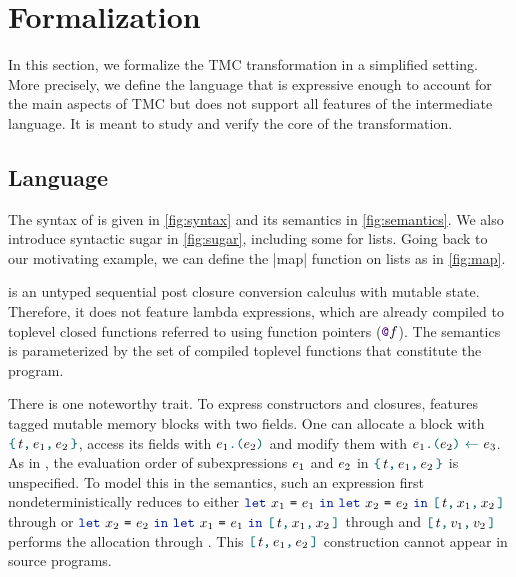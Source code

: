\section{Formalization}

In this section, we formalize the TMC transformation in a simplified setting.
More precisely, we define the \DataLang language that is expressive enough to account for the main aspects of TMC but does not support all features of the \LambdaLang intermediate language.
It is meant to study and verify the core of the transformation.

\subsection{Language}

The syntax of \DataLang is given in \cref{fig:syntax} and its semantics in \cref{fig:semantics}.
We also introduce syntactic sugar in \cref{fig:sugar}, including some for lists.
Going back to our motivating example, we can define the \datalang|map| function on lists as in \cref{fig:map}.

\DataLang is an untyped sequential post closure conversion calculus with mutable state.
Therefore, it does not feature lambda expressions, which are already compiled to toplevel closed functions referred to using function pointers ($\datalangFnptr{\datalangFn}$).
The semantics is parameterized by the set of compiled toplevel functions that constitute the program.

There is one noteworthy trait.
To express constructors and closures, \DataLang features tagged mutable memory blocks with two fields.
One can allocate a block with $\datalangBlock{\datalangTag}{\datalangExpr_1}{\datalangExpr_2}$, access its fields with $\datalangLoad{\datalangExpr_1}{\datalangExpr_2}$ and modify them with $\datalangStore{\datalangExpr_1}{\datalangExpr_2}{\datalangExpr_3}$.
As in \OCaml, the evaluation order of subexpressions $\datalangExpr_1$ and $\datalangExpr_2$ in $\datalangBlock{\datalangTag}{\datalangExpr_1}{\datalangExpr_2}$ is unspecified.
To model this in the semantics, such an expression first nondeterministically reduces to either $\datalangLet{\datalangVar_1}{\datalangExpr_1}{\datalangLet{\datalangVar_2}{\datalangExpr_2}{\datalangBlockDet{\datalangTag}{\datalangVar_1}{\datalangVar_2}}}$ through  or $\datalangLet{\datalangVar_2}{\datalangExpr_2}{\datalangLet{\datalangVar_1}{\datalangExpr_1}{\datalangBlockDet{\datalangTag}{\datalangVar_1}{\datalangVar_2}}}$ through  and $\datalangBlockDet{\datalangTag}{\datalangVal_1}{\datalangVal_2}$ performs the allocation  through .
This $\datalangBlockDet{\datalangTag}{\datalangExpr_1}{\datalangExpr_2}$ construction cannot appear in source programs.

